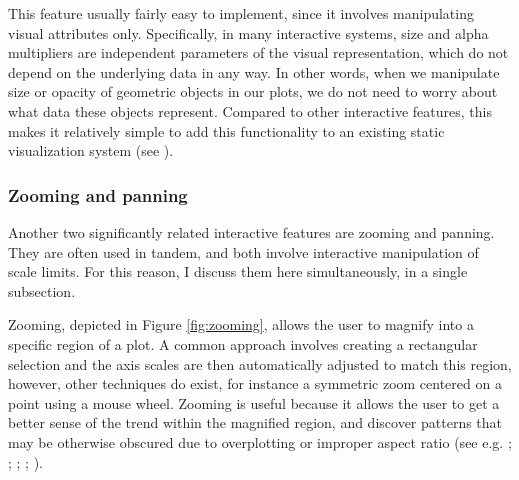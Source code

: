\documentclass[
]{book}
\theoremstyle{definition}
\theoremstyle{definition}
\theoremstyle{definition}
\theoremstyle{definition}
\theoremstyle{remark}
\begin{document}
This feature usually fairly easy to implement, since it involves manipulating visual attributes only. Specifically, in many interactive systems, size and alpha multipliers are independent parameters of the visual representation, which do not depend on the underlying data in any way. In other words, when we manipulate size or opacity of geometric objects in our plots, we do not need to worry about what data these objects represent. Compared to other interactive features, this makes it relatively simple to add this functionality to an existing static visualization system (see ).

\subsubsection{Zooming and panning}\label{zooming-and-panning}

Another two significantly related interactive features are zooming and panning. They are often used in tandem, and both involve interactive manipulation of scale limits. For this reason, I discuss them here simultaneously, in a single subsection.

Zooming, depicted in Figure \ref{fig:zooming}, allows the user to magnify into a specific region of a plot. A common approach involves creating a rectangular selection and the axis scales are then automatically adjusted to match this region, however, other techniques do exist, for instance a symmetric zoom centered on a point using a mouse wheel. Zooming is useful because it allows the user to get a better sense of the trend within the magnified region, and discover patterns that may be otherwise obscured due to overplotting or improper aspect ratio (see e.g. ; ; ; ; ).
\end{document}
